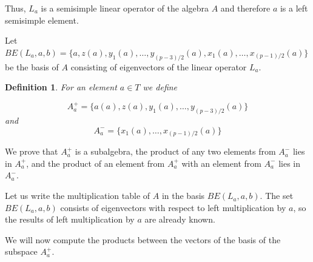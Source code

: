 \documentclass[12pt]{article}
\newtheorem{defi}{Definition}
\begin{document}


Thus, $L_a$ is a semisimple linear operator of the algebra $A$ and therefore $a$ is a left semisimple element.

Let $BE(L_a,{a,b}) = \{a, z(a), y_1(a),\dots,y_{(p-3)/2}(a), x_1(a),\dots,x_{(p-1)/2}(a)\}$ be the basis of $A$ consisting of eigenvectors of the linear operator $L_a$. 
\begin{defi}
For an element $a\in T$ we define 
   
$$A^+_a=\{a(a), z(a), y_1(a),\dots,y_{(p-3)/2}(a)\}$$ and $$A^-_a=\{x_1(a),\dots,x_{(p-1)/2}(a)\}$$    
\end{defi}

We prove that $A^+_a$ is a subalgebra, the product of any two elements from $A^-_a$ lies in $A^+_a$, and the product of an element from $A^+_a$ with an element from $A^-_a$ lies in $A^-_a$.

Let us write the multiplication table of $A$ in the basis $BE(L_a,{a,b})$. The set $BE(L_a,{a,b})$ consists of eigenvectors with respect to left multiplication by $a$, so the results of left multiplication by $a$ are already known.

We will now compute the products between the vectors of the basis of the subspace $A_a^+$.
\end{document}
